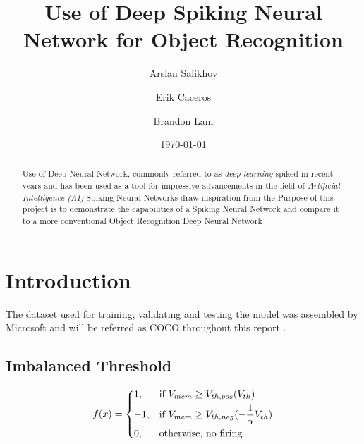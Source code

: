 \documentclass{article}
\title{Use of Deep Spiking Neural Network for Object Recognition}
\author{Arslan Salikhov  \\
	\and 
	Erik Caceros \\
	\and
	Brandon Lam \\
	}
\date{\today}
\begin{document}
\begin{titlingpage}
\maketitle
\end{titlingpage}


\tableofcontents
\newpage


\begin{abstract}
Use of Deep Neural Network, commonly referred to as
\emph{deep learning} spiked in recent years and has been used
as a tool for impressive advancements in the field of 
\emph{Artificial Intelligence (AI)}
Spiking Neural Networks draw inspiration from the 
Purpose of this project is to demonstrate the capabilities of a 
Spiking Neural Network and compare it to a more conventional 
Object Recognition Deep Neural Network
\end{abstract}

\section{Introduction}

The dataset used for training, validating and testing the 
model was assembled by Microsoft and will be referred as
COCO throughout this report .

\subsection{Imbalanced Threshold} 
\[
    f(x)= 
\begin{dcases}
    1 ,& \text{if } {V_{mem}}\geq V_{th,pos}(V_{th})\\
	-1 ,& \text{if } {V_{mem}}\geq V_{th,neg}(-\frac{1}{\alpha}V_{th})\\
    0,              & \text{otherwise, no firing}
\end{dcases}
\]

\newpage


\end{document}
